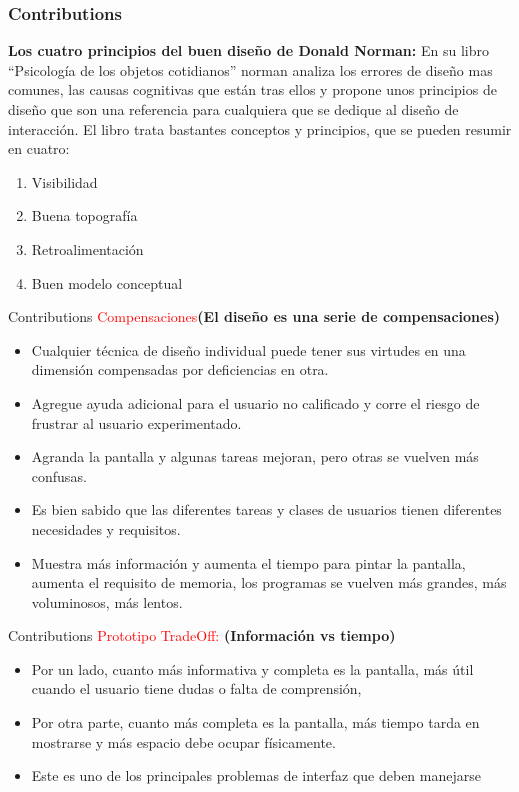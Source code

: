 \documentclass[11pt]{beamer}
\begin{document}
\begin{frame}
\frametitle{Contributions}

\textbf{Los cuatro principios del buen diseño de Donald Norman:}
En su libro “Psicología de los objetos cotidianos” norman analiza los errores de diseño mas comunes, las causas cognitivas que están tras ellos y propone unos principios de diseño que son una referencia para cualquiera que se dedique al diseño de interacción. El libro trata bastantes conceptos y principios, que se pueden resumir en cuatro:

\begin{enumerate}
    \item Visibilidad
    \item Buena topografía
    \item Retroalimentación
    \item Buen modelo conceptual
\end{enumerate}

\end{frame}
\begin{frame}{Contributions}
\textcolor{red}{Compensaciones}\textbf{(El diseño es una serie de compensaciones)}
\begin{itemize}
    \item Cualquier técnica de diseño individual puede tener sus virtudes en una dimensión compensadas por deficiencias en otra. \item Agregue ayuda adicional para el usuario no calificado y corre el riesgo de frustrar al usuario experimentado.
    \item Agranda la pantalla y algunas tareas mejoran, pero otras se vuelven más confusas. 
    \item Es bien sabido que las diferentes tareas y clases de usuarios tienen diferentes necesidades y requisitos.
    \item Muestra más información y aumenta el tiempo para pintar la pantalla, aumenta el requisito de memoria, los programas se vuelven más grandes, más voluminosos, más lentos. 
\end{itemize}
\end{frame}
\begin{frame}{Contributions}
\textcolor{red}{Prototipo TradeOff:}\textbf{ (Información vs tiempo)}
\begin{itemize}
    \item Por un lado, cuanto más informativa y completa es la pantalla, más útil cuando el usuario tiene dudas o falta de comprensión, 
    \item Por otra parte, cuanto más completa es la pantalla, más tiempo tarda en mostrarse y más espacio debe ocupar físicamente. \item Este es uno de los principales problemas de interfaz que deben manejarse
\end{itemize}
\end{frame}
\end{document}

